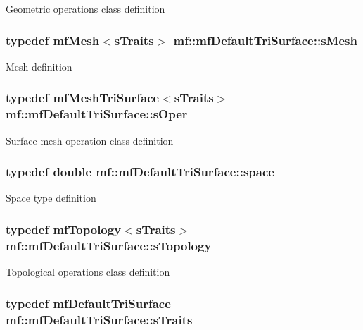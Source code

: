 \label{structmf_1_1mfDefaultTriSurface_a6b9571826473f2d8c08f7f7d088237ea}
Geometric operations class definition \hypertarget{structmf_1_1mfDefaultTriSurface_a8a7c339735cc6cc0fd04c9c6c22407f7}{
\subsubsection[{sMesh}]{\setlength{\rightskip}{0pt plus 5cm}typedef {\bf mfMesh}$<${\bf sTraits}$>$ {\bf mf::mfDefaultTriSurface::sMesh}}}
\label{structmf_1_1mfDefaultTriSurface_a8a7c339735cc6cc0fd04c9c6c22407f7}
Mesh definition \hypertarget{structmf_1_1mfDefaultTriSurface_a7f212692b1ccab0319f7cec468d17794}{
\subsubsection[{sOper}]{\setlength{\rightskip}{0pt plus 5cm}typedef {\bf mfMeshTriSurface}$<${\bf sTraits}$>$ {\bf mf::mfDefaultTriSurface::sOper}}}
\label{structmf_1_1mfDefaultTriSurface_a7f212692b1ccab0319f7cec468d17794}
Surface mesh operation class definition \hypertarget{structmf_1_1mfDefaultTriSurface_af6237ce42d8f511466140e023477ddca}{
\subsubsection[{space}]{\setlength{\rightskip}{0pt plus 5cm}typedef double {\bf mf::mfDefaultTriSurface::space}}}
\label{structmf_1_1mfDefaultTriSurface_af6237ce42d8f511466140e023477ddca}
Space type definition \hypertarget{structmf_1_1mfDefaultTriSurface_a7679a9f9f0041ec734572e8da23acd92}{
\subsubsection[{sTopology}]{\setlength{\rightskip}{0pt plus 5cm}typedef {\bf mfTopology}$<${\bf sTraits}$>$ {\bf mf::mfDefaultTriSurface::sTopology}}}
\label{structmf_1_1mfDefaultTriSurface_a7679a9f9f0041ec734572e8da23acd92}
Topological operations class definition \hypertarget{structmf_1_1mfDefaultTriSurface_a5c521b16ac8225693266fec444241084}{
\subsubsection[{sTraits}]{\setlength{\rightskip}{0pt plus 5cm}typedef {\bf mfDefaultTriSurface} {\bf mf::mfDefaultTriSurface::sTraits}}}
